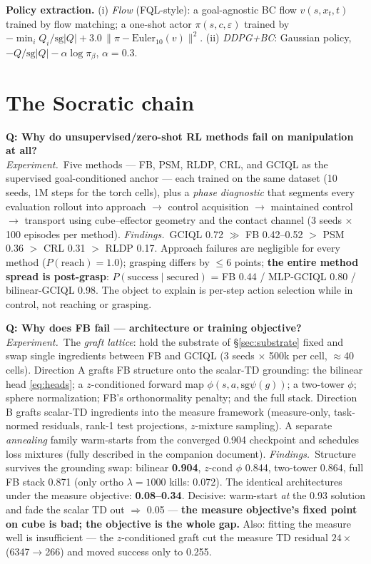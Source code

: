 \documentclass[11pt]{article}
\newcommand{\sg}{\mathrm{sg}}
\newcommand{\numgood}[1]{\textbf{\textcolor{green!45!black}{#1}}}
\newcommand{\numbad}[1]{\textbf{\textcolor{red!65!black}{#1}}}
\newcommand{\whyq}[1]{\medskip\noindent\textbf{\textcolor{blue!50!black}{Q: Why #1}}\\}
\newcommand{\exppar}{\noindent\emph{Experiment.}\ }
\newcommand{\findpar}{\noindent\emph{Findings.}\ }
\begin{document}
\textbf{Policy extraction.} (i) \emph{Flow} (FQL-style): a goal-agnostic BC flow $v(s,x_t,t)$
trained by flow matching; a one-shot actor $\pi(s,c,\varepsilon)$ trained by
$-\min_iQ_i/\sg|Q| + 3.0\,\|\pi-\mathrm{Euler}_{10}(v)\|^2$. (ii) \emph{DDPG+BC}: Gaussian
policy, $-Q/\sg|Q| - \alpha\log\pi_\beta$, $\alpha{=}0.3$.

\section{The Socratic chain}\label{sec:chain}

\whyq{do unsupervised/zero-shot RL methods fail on manipulation at all?}
\exppar Five methods --- FB, PSM, RLDP, CRL, and GCIQL as the supervised goal-conditioned
anchor --- each trained on the same dataset (10 seeds, 1M steps for the torch cells), plus a
\emph{phase diagnostic} that segments every evaluation rollout into approach $\to$ control
acquisition $\to$ maintained control $\to$ transport using cube--effector geometry and the
contact channel (3 seeds $\times$ 100 episodes per method).
\findpar GCIQL 0.72 $\gg$ FB 0.42--0.52 $>$ PSM 0.36 $>$ CRL 0.31 $>$ RLDP 0.17.
Approach failures are negligible for every method ($P(\mathrm{reach}){=}1.0$); grasping
differs by $\le 6$ points; \textbf{the entire method spread is post-grasp}:
$P(\mathrm{success}\mid\mathrm{secured})$ = FB 0.44 / MLP-GCIQL 0.80 / bilinear-GCIQL 0.98.
The object to explain is per-step action selection while in control, not reaching or
grasping.

\whyq{does FB fail --- architecture or training objective?}
\exppar The \emph{graft lattice}: hold the substrate of \S\ref{sec:substrate} fixed and swap
single ingredients between FB and GCIQL (3 seeds $\times$ 500k per cell, $\approx$40 cells).
Direction A grafts FB structure onto the scalar-TD grounding: the bilinear head
\eqref{eq:heads}; a $z$-conditioned forward map $\phi(s,a,\sg\psi(g))$; a two-tower $\phi$;
sphere normalization; FB's orthonormality penalty; and the full stack. Direction B grafts
scalar-TD ingredients into the measure framework (measure-only, task-normed residuals,
rank-1 test projections, $z$-mixture sampling). A separate \emph{annealing} family
warm-starts from the converged 0.904 checkpoint and schedules loss mixtures (fully described
in the companion document).
\findpar Structure survives the grounding swap: bilinear \numgood{0.904}, $z$-cond $\phi$
0.844, two-tower 0.864, full FB stack 0.871 (only ortho $\lambda{=}1000$ kills: 0.072).
The identical architectures under the measure objective: \numbad{0.08--0.34}. Decisive:
warm-start \emph{at} the 0.93 solution and fade the scalar TD out $\Rightarrow$ 0.05 ---
\textbf{the measure objective's fixed point on cube is bad; the objective is the whole gap.}
Also: fitting the measure well is insufficient --- the $z$-conditioned graft cut the measure
TD residual $24\times$ (6347$\to$266) and moved success only to 0.255.
\end{document}
